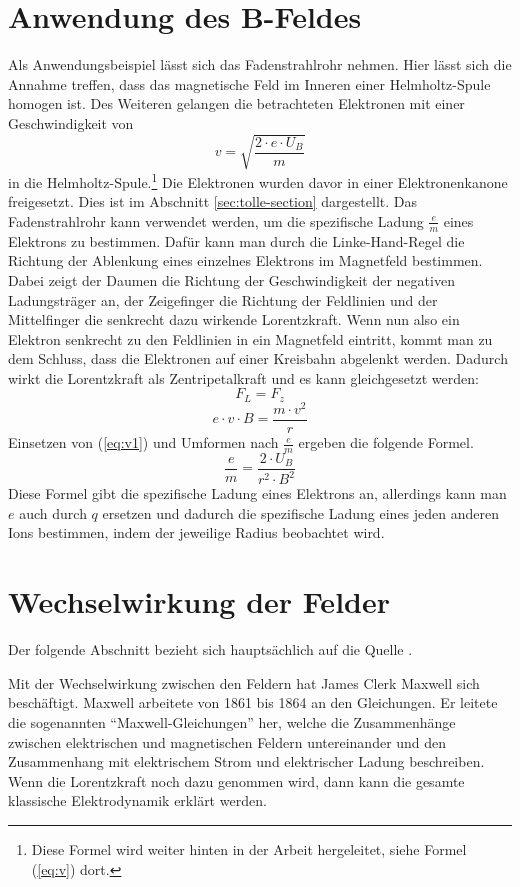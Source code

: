 \section{Anwendung des B-Feldes}
\label{sec:Fadenstrahlrohr}
Als Anwendungsbeispiel lässt sich das Fadenstrahlrohr nehmen.
Hier lässt sich die Annahme treffen, dass das magnetische Feld im Inneren einer Helmholtz-Spule homogen ist. Des Weiteren gelangen die betrachteten Elektronen mit einer Geschwindigkeit von 
\begin{equation}
\label{eq:v1}
    v=\sqrt{\frac{2 \cdot e \cdot U_B}{m}}
\end{equation}
in die Helmholtz-Spule.\footnote{Diese Formel wird weiter hinten in der Arbeit hergeleitet, siehe Formel (\ref{eq:v}) dort.}
Die Elektronen wurden davor in einer Elektronenkanone freigesetzt.
Dies ist im Abschnitt \ref{sec:tolle-section} dargestellt. 
Das Fadenstrahlrohr kann verwendet werden, um die spezifische Ladung $\frac{e}{m}$ eines Elektrons zu bestimmen.
Dafür kann man durch die Linke-Hand-Regel die Richtung der Ablenkung eines einzelnes Elektrons im Magnetfeld bestimmen.
Dabei zeigt der Daumen die Richtung der Geschwindigkeit der negativen Ladungsträger an, der Zeigefinger die Richtung der Feldlinien und der Mittelfinger die senkrecht dazu wirkende Lorentzkraft.
Wenn nun also ein Elektron senkrecht zu den Feldlinien in ein Magnetfeld eintritt, kommt man zu dem Schluss, dass die Elektronen auf einer Kreisbahn abgelenkt werden. 
Dadurch wirkt die Lorentzkraft als Zentripetalkraft und es kann gleichgesetzt werden:
$$F_L = F_z$$
$$e \cdot v \cdot B = \frac{m \cdot v^2}{r}$$
Einsetzen von (\ref{eq:v1}) und  Umformen nach $\frac{e}{m}$ ergeben die folgende Formel.
\begin{equation*}
    \frac{e}{m} = \frac{2 \cdot U_B}{ r^2 \cdot B^2}
\end{equation*}
Diese Formel gibt die spezifische Ladung eines Elektrons an, allerdings kann man $e$ auch durch $q$ ersetzen und dadurch die spezifische Ladung eines jeden anderen Ions bestimmen, indem der jeweilige Radius beobachtet wird.
\section{Wechselwirkung der Felder}%
\label{sec:Maxwell}
Der folgende Abschnitt bezieht sich hauptsächlich auf die Quelle \cite{Maxwell}.

Mit der Wechselwirkung zwischen den Feldern hat James Clerk Maxwell sich
beschäftigt.
Maxwell arbeitete von 1861 bis 1864 an den Gleichungen.
Er leitete die sogenannten "`Maxwell-Gleichungen"' her, welche die Zusammenhänge zwischen elektrischen und magnetischen Feldern untereinander und den Zusammenhang mit elektrischem Strom und elektrischer Ladung beschreiben.
Wenn die Lorentzkraft noch dazu genommen wird, dann kann die gesamte klassische Elektrodynamik erklärt werden.

